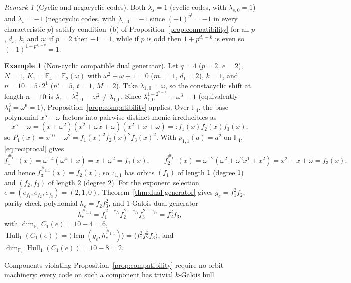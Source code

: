 \documentclass[preprint,12pt]{elsarticle}
\newcommand{\F}{\mathbb F}
\newcommand{\Hull}{\operatorname{Hull}}
\newcommand{\lcm}{\operatorname{lcm}}
\numberwithin{equation}{section}
\theoremstyle{plain}
\theoremstyle{definition}
\newtheorem{example}[theorem]{Example}
\theoremstyle{remark}
\newtheorem{remark}[theorem]{Remark}
\begin{document}
\begin{remark}[Cyclic and negacyclic codes]\label{rem:cyclic-negacyclic}
Both $\lambda_s=1$ (cyclic codes, with $\lambda_{s,0}=1$) and $\lambda_s=-1$
(negacyclic codes, with $\lambda_{s,0}=-1$ since $(-1)^{p^t}=-1$ in every
characteristic $p$) satisfy condition~\textup{(b)} of
Proposition~\ref{prop:compatibility} for all $p$, $d_s$, $k$, and $n$: if $p=2$
then $-1=1$, while if $p$ is odd then $1+p^{d_s-k}$ is even so
$(-1)^{1+p^{d_s-k}}=1$.
\end{remark}

\begin{example}[Non-cyclic compatible dual generator]\label{ex:gate-g1-compatible}
Let $q=4$ ($p=2$, $e=2$), $N=1$, $K_1=\F_4=\F_2(\omega)$ with
$\omega^2+\omega+1=0$ ($m_1=1$, $d_1=2$), $k=1$, and $n=10=5\cdot 2^1$ ($n'=5$,
$t=1$, $M=2$). Take $\lambda_{1,0}=\omega$, so the constacyclic shift at length
$n=10$ is $\lambda_1=\lambda_{1,0}^2=\omega^2\neq\lambda_{1,0}$. Since
$\lambda_{1,0}^{1+2^{2-1}}=\omega^3=1$ (equivalently $\lambda_1^3=\omega^6=1$),
Proposition~\ref{prop:compatibility} applies. Over $\F_4$, the base polynomial
$x^5-\omega$ factors into pairwise distinct monic irreducibles as
\[
x^5-\omega=(x+\omega^2)(x^2+\omega x+\omega)(x^2+x+\omega)
          =:f_1(x)f_2(x)f_3(x),
\]
so $P_1(x)=x^{10}-\omega^2=f_1(x)^2 f_2(x)^2 f_3(x)^2$. With $\rho_{1,1}(a)=a^2$
on $\F_4$, \eqref{eq:reciprocal} gives
\[
f_1^{\#_{1,1}}(x)=\omega^{-4}(\omega^4+x)=x+\omega^2=f_1(x),\qquad
f_2^{\#_{1,1}}(x)=\omega^{-2}(\omega^2+\omega^2 x^1+x^2)=x^2+x+\omega=f_3(x),
\]
and hence $f_3^{\#_{1,1}}(x)=f_2(x)$, so $\tau_{1,1}$ has orbits $(f_1)$ of
length $1$ (degree $1$) and $(f_2,f_3)$ of length $2$ (degree $2$). For the
exponent selection $e=(e_{f_1},e_{f_2},e_{f_3})=(2,1,0)$,
Theorem~\ref{thm:dual-generator} gives $g_e=f_1^2 f_2$, parity-check polynomial
$h_e=f_2 f_3^2$, and $1$-Galois dual generator
\[
h_e^{\#_{1,1}}=f_1^{\,2-e_{f_1}} f_2^{\,2-e_{f_3}} f_3^{\,2-e_{f_2}}
              =f_2^2 f_3,
\]
with $\dim_{\F_4}C_1(e)=10-4=6$,
$\Hull_1(C_1(e))=\langle\lcm(g_e,h_e^{\#_{1,1}})\rangle=\langle f_1^2 f_2^2 f_3\rangle$,
and $\dim_{\F_4}\Hull_1(C_1(e))=10-8=2$.
\end{example}

Components violating Proposition~\ref{prop:compatibility} require no orbit
machinery: every code on such a component has trivial $k$-Galois hull.
\end{document}
